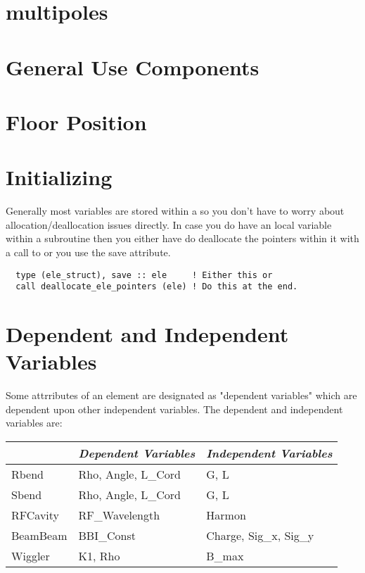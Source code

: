 {{{{%
\section {multipoles}

\section{General Use Components}

\section{Floor Position}

\section{Initializing}

Generally most  variables are stored within a
 so you don't have to worry about
allocation/deallocation issues directly. In case you do have an local
 variable within a subroutine then you either have do
deallocate the pointers within it with a call to
 or you use the save attribute.
\begin{verbatim}
  type (ele_struct), save :: ele     ! Either this or
  call deallocate_ele_pointers (ele) ! Do this at the end.
\end{verbatim}


\section{Dependent and Independent Variables}

Some attrributes of an element are designated as "dependent variables"
which are dependent upon other independent variables. The dependent
and independent variables are: \hfil\break
\begin{center}
\begin{tabular}{|l|l|l|} \hline
           & {\em Dependent Variables}  & {\em Independent Variables}\\ \hline
  Rbend    & Rho, Angle, L\_Cord    & G, L                         \\ \hline
  Sbend    & Rho, Angle, L\_Cord    & G, L                         \\ \hline
  RFCavity & RF\_Wavelength         & Harmon                       \\ \hline
  BeamBeam & BBI\_Const             & Charge, Sig\_x, Sig\_y       \\ \hline
  Wiggler  & K1, Rho                & B\_max                       \\ \hline
\end{tabular}
\end{center}

}}}}
